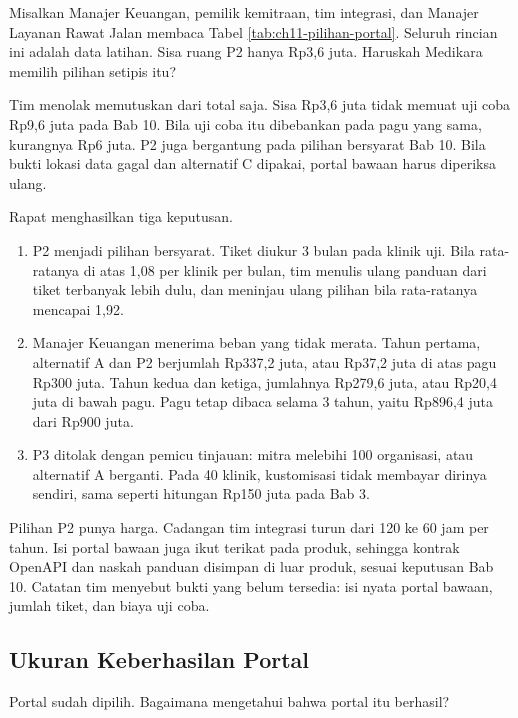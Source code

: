 \begin{kasus}[title={Kasus Medikara Health: Portal yang Muat dalam Rp91,2 Juta}]
Misalkan Manajer Keuangan, pemilik kemitraan, tim integrasi, dan Manajer Layanan Rawat Jalan membaca Tabel
\ref{tab:ch11-pilihan-portal}. Seluruh rincian ini adalah data latihan. Sisa ruang P2 hanya Rp3,6 juta. Haruskah Medikara
memilih pilihan setipis itu?

Tim menolak memutuskan dari total saja. Sisa Rp3,6 juta tidak memuat uji coba Rp9,6 juta pada Bab 10. Bila uji coba itu
dibebankan pada pagu yang sama, kurangnya Rp6 juta. P2 juga bergantung pada pilihan bersyarat Bab 10. Bila bukti lokasi data gagal dan
alternatif C dipakai, portal bawaan harus diperiksa ulang.

Rapat menghasilkan tiga keputusan.
\begin{enumerate}
  \item P2 menjadi pilihan bersyarat. Tiket diukur 3 bulan pada klinik uji. Bila rata-ratanya di atas 1,08 per klinik per bulan,
        tim menulis ulang panduan dari tiket terbanyak lebih dulu, dan meninjau ulang pilihan bila rata-ratanya mencapai 1,92.
  \item Manajer Keuangan menerima beban yang tidak merata. Tahun pertama, alternatif A dan P2 berjumlah Rp337,2 juta, atau Rp37,2 juta
        di atas pagu Rp300 juta. Tahun kedua dan ketiga, jumlahnya Rp279,6 juta, atau Rp20,4 juta di bawah pagu. Pagu tetap
        dibaca selama 3 tahun, yaitu Rp896,4 juta dari Rp900 juta.
  \item P3 ditolak dengan pemicu tinjauan: mitra melebihi 100 organisasi, atau alternatif A berganti. Pada 40 klinik, kustomisasi
        tidak membayar dirinya sendiri, sama seperti hitungan Rp150 juta pada Bab 3.
\end{enumerate}

Pilihan P2 punya harga. Cadangan tim integrasi turun dari 120 ke 60 jam per tahun. Isi portal bawaan juga ikut terikat pada
produk, sehingga kontrak OpenAPI dan naskah panduan disimpan di luar produk, sesuai keputusan Bab 10. Catatan tim menyebut
bukti yang belum tersedia: isi nyata portal bawaan, jumlah tiket, dan biaya uji coba.
\end{kasus}

\subsection{Ukuran Keberhasilan Portal}

Portal sudah dipilih. Bagaimana mengetahui bahwa portal itu berhasil?

